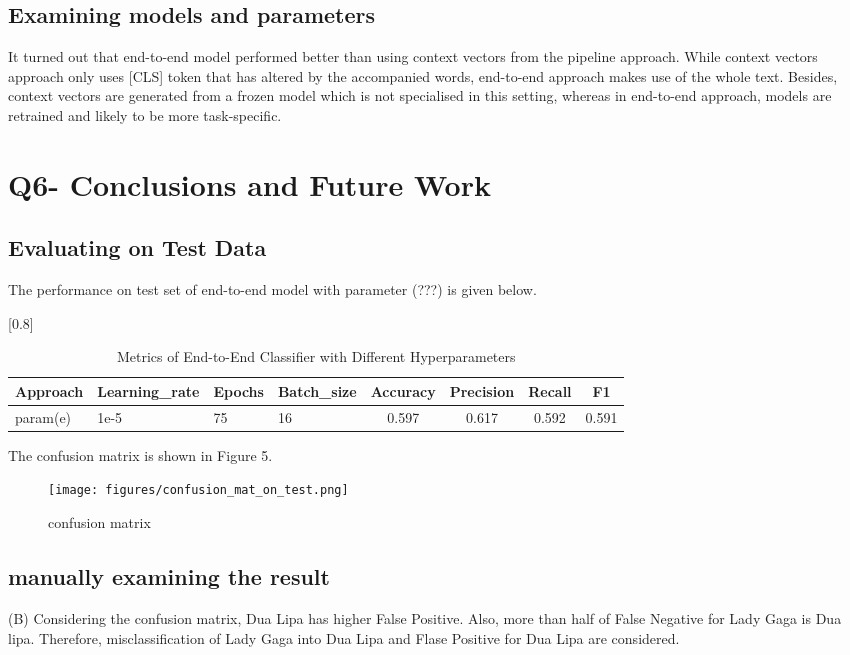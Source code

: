\documentclass[a4paper,11pt]{article}
\begin{document}
\subsection{Examining models and parameters}
It turned out that end-to-end model performed better than using context vectors from the pipeline approach.
While context vectors approach only uses [CLS] token that has altered by the accompanied words,
end-to-end approach makes use of the whole text.
Besides, context vectors are generated from a frozen model which is not specialised in this setting,
whereas in end-to-end approach, models are retrained and likely to be more task-specific.


\section{Q6- Conclusions and Future Work}
\subsection{Evaluating on Test Data}
The performance on test set of end-to-end model with parameter (???) is given below.
\begin{table}[htbp]
    \caption{Metrics of End-to-End Classifier with Different Hyperparameters}
    \small
    \scalebox{0.8}[0.8]{
    \begin{tabular}{l|lll|cccc}
         Approach & Learning\_rate & Epochs & Batch\_size & Accuracy & Precision & Recall & F1 \\ \hline 
         param(e)                  & 1e-5& 75& 16  & 0.597 & 0.617 & 0.592  & 0.591 \\
    \end{tabular}
    }
\end{table}

The confusion matrix is shown in Figure 5.
\begin{figure}[htbp]
  \begin{center}
  \texttt{[image: figures/confusion\_mat\_on\_test.png]}
  \caption{confusion matrix}
  \end{center}
\end{figure}

\subsection{manually examining the result}
(B)
Considering the confusion matrix, Dua Lipa has higher False Positive.
Also, more than half of False Negative for Lady Gaga is Dua lipa.
Therefore, misclassification of Lady Gaga into Dua Lipa and Flase Positive for Dua Lipa are considered.
\end{document}
